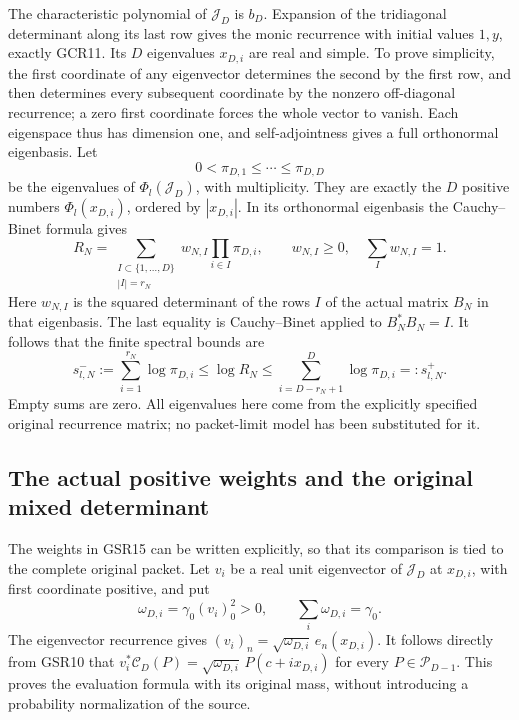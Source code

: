\documentclass[11pt,a4paper]{article}
\begin{document}
The characteristic polynomial of $\mathcal J_D$ is $b_D$.
Expansion of the tridiagonal determinant along its last row
gives the monic recurrence with initial values $1,y$, exactly
GCR11. Its $D$ eigenvalues $x_{D,i}$ are real and simple.
To prove simplicity, the first coordinate of any eigenvector
determines the second by the first row, and then determines
every subsequent coordinate by the nonzero off-diagonal
recurrence; a zero first coordinate forces the whole vector
to vanish. Each eigenspace thus has dimension one, and
self-adjointness gives a full orthonormal eigenbasis.
Let
\[
 0<\pi_{D,1}\leq\cdots\leq\pi_{D,D}
\]
be the eigenvalues of $\Phi_l(\mathcal J_D)$, with multiplicity.
They are exactly the $D$ positive numbers
$\Phi_l(x_{D,i})$, ordered by $|x_{D,i}|$.
In its orthonormal eigenbasis the Cauchy--Binet formula gives
\[
 R_N=\sum_{\substack{I\subset\{1,\ldots,D\}\\|I|=r_N}}
       w_{N,I}\prod_{i\in I}\pi_{D,i},\qquad
 w_{N,I}\geq0,\quad\sum_Iw_{N,I}=1.
\tag{GSR15}
\]
Here $w_{N,I}$ is the squared determinant of the rows $I$
of the actual matrix $B_N$ in that eigenbasis. The last equality
is Cauchy--Binet applied to $B_N^*B_N=I$.
It follows that the finite spectral bounds are
\[
 s^-_{l,N}:=\sum_{i=1}^{r_N}\log\pi_{D,i}
       \leq\log R_N
       \leq\sum_{i=D-r_N+1}^D\log\pi_{D,i}
                       =:s^+_{l,N}.
\tag{GSR16}
\]
Empty sums are zero. All eigenvalues here come from the explicitly
specified original recurrence matrix; no packet-limit model has
been substituted for it.

\subsection{The actual positive weights and the original mixed determinant}

The weights in GSR15 can be written explicitly, so that its
comparison is tied to the complete original packet. Let $v_i$
be a real unit eigenvector of $\mathcal J_D$ at $x_{D,i}$,
with first coordinate positive, and put
\[
 \omega_{D,i}=\gamma_0(v_i)_0^2>0,\qquad
                    \sum_i\omega_{D,i}=\gamma_0.
\tag{GSR17}
\]
The eigenvector recurrence gives
$(v_i)_n=\sqrt{\omega_{D,i}}\,e_n(x_{D,i})$.
It follows directly from GSR10 that
$v_i^*\mathcal C_D(P)=
\sqrt{\omega_{D,i}}\,P(c+ix_{D,i})$ for every
$P\in\mathcal P_{D-1}$. This proves the evaluation formula
with its original mass, without introducing a probability
normalization of the source.
\end{document}
